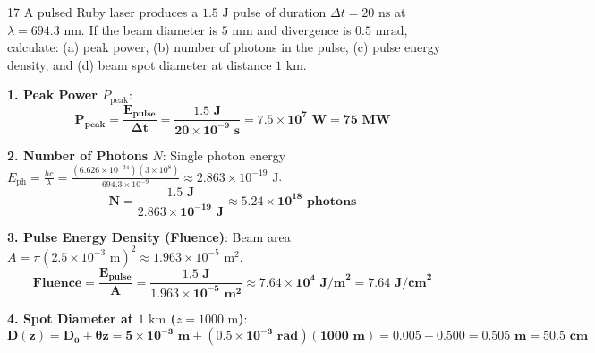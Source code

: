 \begin{theoryq}{17}
A pulsed Ruby laser produces a $1.5\text{ J}$ pulse of duration $\Delta t = 20\text{ ns}$ at $\lambda = 694.3\text{ nm}$. If the beam diameter is $5\text{ mm}$ and divergence is $0.5\text{ mrad}$, calculate: (a) peak power, (b) number of photons in the pulse, (c) pulse energy density, and (d) beam spot diameter at distance $1\text{ km}$.
\end{theoryq}
\begin{theorysol}
\textbf{1. Peak Power $P_{\text{peak}}$}:
\begin{equation}
\mathbf{P_{\text{peak}} = \frac{E_{\text{pulse}}}{\Delta t} = \frac{1.5\text{ J}}{20 \times 10^{-9}\text{ s}} = 7.5 \times 10^7\text{ W} = 75\text{ MW}}
\end{equation}

\textbf{2. Number of Photons $N$}:
Single photon energy $E_{\text{ph}} = \frac{hc}{\lambda} = \frac{(6.626 \times 10^{-34})(3 \times 10^8)}{694.3 \times 10^{-9}} \approx 2.863 \times 10^{-19}\text{ J}$.
\begin{equation}
\mathbf{N = \frac{1.5\text{ J}}{2.863 \times 10^{-19}\text{ J}} \approx 5.24 \times 10^{18}\text{ photons}}
\end{equation}

\textbf{3. Pulse Energy Density (Fluence)}:
Beam area $A = \pi (2.5 \times 10^{-3}\text{ m})^2 \approx 1.963 \times 10^{-5}\text{ m}^2$.
\begin{equation}
\mathbf{\text{Fluence} = \frac{E_{\text{pulse}}}{A} = \frac{1.5\text{ J}}{1.963 \times 10^{-5}\text{ m}^2} \approx 7.64 \times 10^4\text{ J/m}^2 = 7.64\text{ J/cm}^2}
\end{equation}

\textbf{4. Spot Diameter at $1\text{ km}$ ($z = 1000\text{ m}$)}:
\begin{equation}
\mathbf{D(z) = D_0 + \theta z = 5 \times 10^{-3}\text{ m} + (0.5 \times 10^{-3}\text{ rad})(1000\text{ m}) = 0.005 + 0.500 = 0.505\text{ m} = 50.5\text{ cm}}
\end{equation}
\end{theorysol}
\vspace{4mm}

